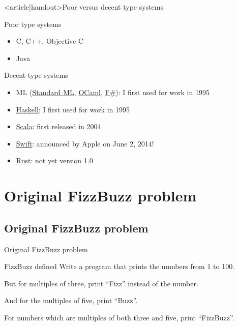 \begin{frame}<article|handout>{Poor versus decent type systems}
  \begin{block}{Poor type systems}
    \begin{itemize}
    \item C, C++, Objective C
    \item Java
    \end{itemize}
  \end{block}

  \begin{block}{Decent type systems}
    \begin{itemize}
    \item ML (\href{http://www.smlnj.org/}{Standard ML}, \href{http://swift.org/}{OCaml}, \href{http://fsharp.org/}{F\#}): I first used for work in 1995
    \item \href{http://www.haskell.org/}{Haskell}: I first used for work in 1995
    \item \href{http://www.scala-lang.org/}{Scala}: first released in 2004
    \item \href{http://developer.apple.com/swift/}{Swift}: announced by Apple on June 2, 2014!
    \item \href{http://www.rust-lang.org/}{Rust}: not yet version 1.0
    \end{itemize}
  \end{block}
\end{frame}

\section{Original FizzBuzz problem}

\subsection{Original FizzBuzz problem}

\begin{frame}{Original FizzBuzz problem}
  \begin{block}{FizzBuzz defined}
    Write a program that prints the numbers from 1 to 100.

    But for multiples of three, print ``Fizz'' instead of the number.

    And for the multiples of five, print ``Buzz''.

    For numbers which are multiples of both three and five, print ``FizzBuzz''.
  \end{block}
\end{frame}

